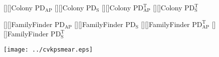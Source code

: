 \documentclass[11pt]{article}
\newcommand{\PDS}{\mathrm{PD_S}}
\newcommand{\PDST}{\mathrm{PD_S^T}}
\newcommand{\W}{\mathrm{PD_{AP}}} %
\newcommand{\WT}{\mathrm{PD_{AP}^T}}
\begin{document}
\pagestyle{empty}

\begin{center}
[][]{{\sf Colony} $\W$}
[][]{{\sf Colony} $\PDS$}
[][]{{\sf Colony} $\WT$}
[][]{{\sf Colony} $\PDST$}

[][]{{\sf FamilyFinder} $\W$}
[][]{{\sf FamilyFinder} $\PDS$}
[][]{{\sf FamilyFinder} $\WT$}
[][]{{\sf FamilyFinder} $\PDST$}

\texttt{[image: ../cvkpsmear.eps]}

\end{center}




 
\end{document}

